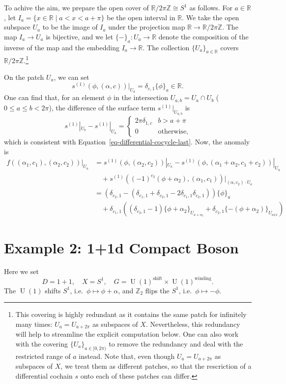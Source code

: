 \documentclass[
  letterpaper,
  DIV=11,
  numbers=noendperiod]{scrreport}
\DeclareMathOperator{\U}{U}
\begin{document}
To achive the aim, we prepare the open cover of
\(\mathbb{R}/2\pi\mathbb{Z}\cong S^1\) as follows. For
\(a \in \mathbb{R}\), let
\(I_a = \{x\in\mathbb{R}\mid a < x < a+\pi \}\) be the open interval in
\(\mathbb{R}\). We take the open subspace \(U_a\) to be the image of
\(I_a\) under the projection map
\(\mathbb{R}\to\mathbb{R}/2\pi\mathbb{Z}\). The map \(I_a \to U_a\) is
bijective, and we let \(\{\mathord{-}\}_a : U_a \to \mathbb{R}\) denote
the composition of the inverse of the map and the embedding
\(I_a \to \mathbb{R}\). The collection \(\{U_a\}_{a\in \mathbb{R}}\)
covers \(\mathbb{R}/2\pi\mathbb{Z}\).\footnote{This covering is highly
  redundant as it contains the same patch for infinitely many times:
  \(U_{a} = U_{a+2\pi}\) as subspaces of \(X\). Nevertheless, this
  redundancy will help to streamline the explicit computation below. One
  can also work with the covering \(\{U_a\}_{a\in [0,2\pi)}\) to remove
  the redundancy and deal with the restricted range of \(a\) instead.
  Note that, even though \(U_a = U_{a+2\pi}\) as subspaces of \(X\), we
  treat them as different patches, so that the rescriction of a
  differential cochain \(s\) onto each of these patches can differ.}

On the patch \(U_a\), we can set \[
s^{(1)}(\phi,(\alpha,c))|_{U_a} = \delta_{c,1} \{\phi\}_a \in \mathbb{R}.
\] One can find that, for an element \(\phi\) in the intersection
\(U_{a,b} = U_a \cap U_b\) (\(0\le a \le b<2\pi\)), the difference of
the surface term \(s^{(1)}|_{U_{a,b}}\) is \[
s^{(1)}|_{U_b} - s^{(1)}|_{U_a} =
\begin{cases}
2\pi \delta_{1,c}& b > a+\pi \\
0 & \text{otherwise},
\end{cases}
\] which is consistent with Equation~\ref{eq-differential-cocycle-last}.
Now, the anomaly is \[
\begin{aligned}
f((\alpha_1,c_1),(\alpha_2,c_2))|_{U_a}
&= s^{(1)}(\phi,(\alpha_2,c_2))|_{U_a}-s^{(1)}(\phi,(\alpha_1+\alpha_2,c_1+c_2))|_{U_a} \\ 
& \quad + s^{(1)}((-1)^{c_2}(\phi+\alpha_2),(\alpha_1,c_1))|_{(\alpha,c_2)\cdot U_a}\\
&= (\delta_{c_2,1} - (\delta_{c_1,1}+\delta_{c_2,1}- 2 \delta_{c_1,1}\delta_{c_2,1}))\{\phi\}_a\\
&\quad  + \delta_{c_1,1} ((\delta_{c_2,1}-1)\{\phi+\alpha_2\}_{U_{a+\alpha_2}}+\delta_{c_2,1}\{-(\phi+\alpha_2)\}_{U_{axx}})
\end{aligned}
\]

\section{Example 2: 1+1d Compact
Boson}\label{sec-equivariant-example-2d}

Here we set \[
D=1+1, \quad X = S^1, \quad G = \U(1)^\text{shift}\times \U(1)^\text{winding}.
\] The \(\U(1)\) shifts \(S^1\), i.e.~\(\phi\mapsto \phi+\alpha\), and
\(\mathbb{Z}_2\) flips the \(S^1\), i.e.~\(\phi\mapsto -\phi\).
\end{document}
